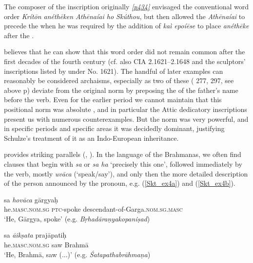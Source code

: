 The composer of the inscription originally \hyperlink{p434}{\emph{[p434]}} envisaged the conventional word order \emph{Krítōn \emph{anéthēken} Athēnaíai ho Skúthou}, but then allowed the  \emph{Athēnaíai} to precede the  when he was required by the addition of \emph{kaì epoíēse} to place \emph{anéthēke} after the .

\citet[xv]{Loewy1885} believes that he can show that this word order did not remain common after the first decades of the fourth century (cf. also CIA 2.1621--2.1648 and the sculptors' inscriptions listed by \citet{Koehler1888} under No. 1621). The handful of later examples can reasonably be considered archaisms, especially as two of these (\citealp{Loewy1885} 277, 297, see above p\pageref{Loewy277}) deviate from the original norm by preposing the  of the father's name before the verb. Even for the earlier period we cannot maintain that this positional norm was absolute \citep[324]{Hoffmann1891}, and in particular the Attic dedicatory inscriptions present us with numerous counterexamples. But the norm was very powerful, and in specific periods and specific areas it was decidedly dominant, justifying Schulze's \citeyearpar{Schulze1890} treatment of it as an Indo-European inheritance.

 provides striking parallels (\citealp[51ff.]{Delbrueck1878}, \citeyear[23f.]{Delbrueck1888}). In the language of the Brahmanas, we often find clauses that begin with \emph{sa} or \emph{sa ha} `precisely this one', followed immediately by the verb, mostly \emph{uvāca} (`speak/say'), and only then the more detailed description of the person announced by the pronoun, e.g. (\ref{Skt_ex4a}) and (\ref{Skt_ex4b}).

\begin{exe}
\ex \gll sa \emph{hovāca} gārgyaḥ\\
he.\textsc{masc.nom.sg} \textsc{ptc}-spoke descendant-of-Garga.\textsc{nom.sg.masc}\\
\trans `He, Gārgya, spoke'
(e.g. \textit{B\d{r}hadāra\d{n}yakopani\d{s}ad})
\label{Skt_ex4a}
\end{exe}

\begin{exe}
\ex \gll sa \emph{āikṣata} prajāpatiḥ\\
he.\textsc{masc.nom.sg} saw Brahmā\\
\trans `He, Brahmā, saw (...)'
(e.g. \textit{Śatapathabrāhmaṇa})
\label{Skt_ex4b}
\end{exe}

